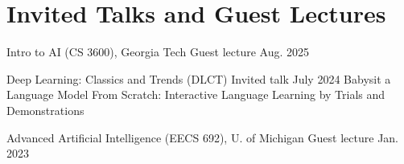 \section{Invited Talks and Guest Lectures}
\CVTalk
  {Intro to AI (CS 3600), Georgia Tech}
  {Guest lecture}
  {Aug. 2025}
  {}

\CVTalk
  {Deep Learning: Classics and Trends (DLCT)}
  {Invited talk}
  {July 2024}
  {Babysit a Language Model From Scratch: Interactive Language Learning by Trials and Demonstrations}

\CVTalk
  {Advanced Artificial Intelligence (EECS 692), U. of Michigan}
  {Guest lecture}
  {Jan. 2023}
  {}
